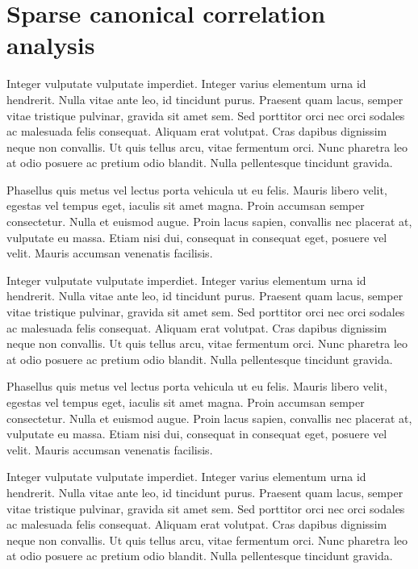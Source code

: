 \section{Sparse canonical correlation analysis}

Integer vulputate vulputate imperdiet. Integer varius elementum urna id hendrerit. Nulla vitae ante leo, id tincidunt purus. Praesent quam lacus, semper vitae tristique pulvinar, gravida sit amet sem. Sed porttitor orci nec orci sodales ac malesuada felis consequat. Aliquam erat volutpat. Cras dapibus dignissim neque non convallis. Ut quis tellus arcu, vitae fermentum orci. Nunc pharetra leo at odio posuere ac pretium odio blandit. Nulla pellentesque tincidunt gravida. 

Phasellus quis metus vel lectus porta vehicula ut eu felis. Mauris libero velit, egestas vel tempus eget, iaculis sit amet magna. Proin accumsan semper consectetur. Nulla et euismod augue. Proin lacus sapien, convallis nec placerat at, vulputate eu massa. Etiam nisi dui, consequat in consequat eget, posuere vel velit. Mauris accumsan venenatis facilisis.

Integer vulputate vulputate imperdiet. Integer varius elementum urna id hendrerit. Nulla vitae ante leo, id tincidunt purus. Praesent quam lacus, semper vitae tristique pulvinar, gravida sit amet sem. Sed porttitor orci nec orci sodales ac malesuada felis consequat. Aliquam erat volutpat. Cras dapibus dignissim neque non convallis. Ut quis tellus arcu, vitae fermentum orci. Nunc pharetra leo at odio posuere ac pretium odio blandit. Nulla pellentesque tincidunt gravida. 

Phasellus quis metus vel lectus porta vehicula ut eu felis. Mauris libero velit, egestas vel tempus eget, iaculis sit amet magna. Proin accumsan semper consectetur. Nulla et euismod augue. Proin lacus sapien, convallis nec placerat at, vulputate eu massa. Etiam nisi dui, consequat in consequat eget, posuere vel velit. Mauris accumsan venenatis facilisis.

Integer vulputate vulputate imperdiet. Integer varius elementum urna id hendrerit. Nulla vitae ante leo, id tincidunt purus. Praesent quam lacus, semper vitae tristique pulvinar, gravida sit amet sem. Sed porttitor orci nec orci sodales ac malesuada felis consequat. Aliquam erat volutpat. Cras dapibus dignissim neque non convallis. Ut quis tellus arcu, vitae fermentum orci. Nunc pharetra leo at odio posuere ac pretium odio blandit. Nulla pellentesque tincidunt gravida. 

